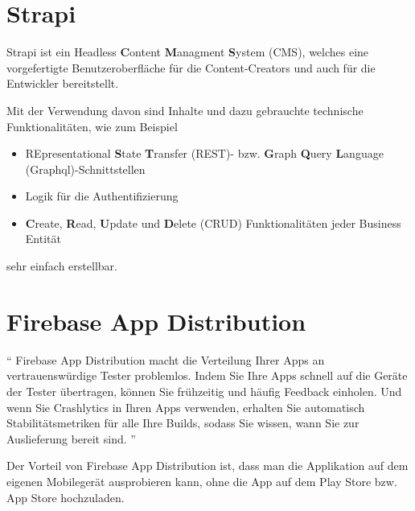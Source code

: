 \section{Strapi}
Strapi ist ein Headless \textbf{C}ontent \textbf{M}anagment \textbf{S}ystem (CMS),
welches eine vorgefertigte Benutzeroberfläche für die Content-Creators
und auch für die Entwickler bereitstellt.

Mit der Verwendung davon sind  Inhalte und dazu gebrauchte technische Funktionalitäten, wie zum Beispiel

\begin{itemize}
    \item {RE}presentational \textbf{S}tate \textbf{T}ransfer (REST)- bzw. \textbf{G}raph \textbf{Q}uery \textbf{L}anguage (Graphql)-Schnittstellen
    \item Logik für die Authentifizierung
    \item \textbf{C}reate, \textbf{R}ead, \textbf{U}pdate und \textbf{D}elete (CRUD)
          Funktionalitäten jeder Business Entität
\end{itemize}

sehr einfach erstellbar.
\cite{strapi-vs-wordpress}


\section{Firebase App Distribution}

``
Firebase App Distribution macht die Verteilung
Ihrer Apps an vertrauenswürdige Tester problemlos. Indem Sie Ihre Apps schnell
auf die Geräte der Tester übertragen, können Sie frühzeitig und häufig
Feedback einholen.
Und wenn Sie Crashlytics in Ihren Apps verwenden, erhalten Sie automatisch Stabilitätsmetriken für alle Ihre Builds, sodass Sie wissen, wann Sie zur Auslieferung bereit sind.
''\cite{fire-base-app-distribution}

Der Vorteil von Firebase App Distribution ist,
dass man die Applikation auf dem eigenen Mobilegerät ausprobieren kann,
ohne die App auf dem Play Store bzw. App Store hochzuladen.